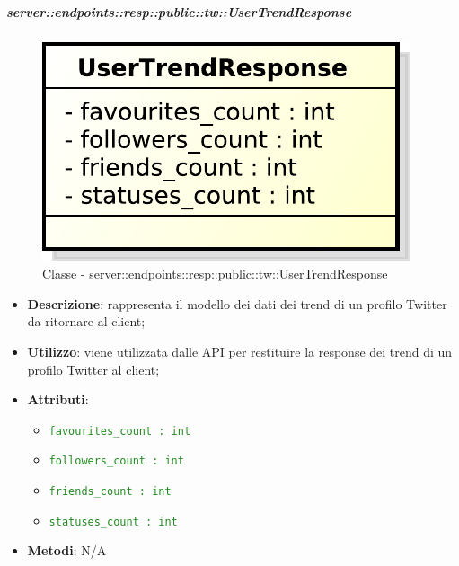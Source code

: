     \subparagraph{server::endpoints::resp::public::tw::UserTrendResponse} %
    \label{subp:bdsm_app_server_endpoints_resp_public_tw_usertrendresponse}
  \begin{figure}[!htbp]
    \centering
    \centerline{\includegraphics[scale=0.6]{./images/server/classes/endpoints/tw/user_trend_response.pdf}}
    \caption{Classe - server::endpoints::resp::public::tw::UserTrendResponse}
  \end{figure}
    \begin{itemize}
      \item \textbf{Descrizione}: rappresenta il modello dei dati dei trend di un profilo Twitter da ritornare al client;
      \item \textbf{Utilizzo}: viene utilizzata dalle API per restituire la response dei trend di un profilo Twitter al client;

    \item \textbf{Attributi}:
      \begin{itemize}
        \item \textcolor{forestgreen}{\texttt{favourites\_count : int}}
        \item \textcolor{forestgreen}{\texttt{followers\_count : int}}
        \item \textcolor{forestgreen}{\texttt{friends\_count : int}}
        \item \textcolor{forestgreen}{\texttt{statuses\_count : int}}
      \end{itemize}
    \item \textbf{Metodi}: N/A
    \end{itemize}
